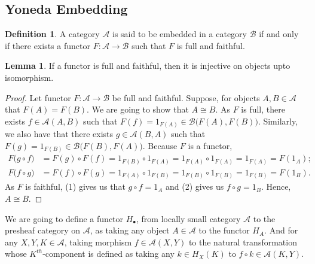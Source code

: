 \documentclass[a4paper]{article}
\theoremstyle{definition}
\newtheorem{definition}[theorem]{Definition}
\newtheorem{lemma}[theorem]{Lemma}
\begin{document}
		\subsection{Yoneda Embedding}%
		\begin{definition} %
			A category $\mathcal{A}$  is said to be embedded in a category $\mathcal{B}$ if
			and only if there exists a functor $F: \mathcal{A} \to \mathcal{B}$
			such that $F$ is full and faithful.
		\end{definition} %
		\begin{lemma}
			If a functor is full and faithful, then it is injective on objects upto isomorphism.
		\end{lemma}
		\begin{proof} \setcounter{equation}{0}
			Let functor $F:\mathcal{A} \to \mathcal{B} $ be full and faithful. Suppose, for
			objects $A,B\in \mathcal{A} $ that $F(A)=F(B)$. We are going to show that
			$A\cong B$. As $F$ is full, there exists $f \in \mathcal{A} (A,B)$ such that
			$F(f)=1_{F(A)}\in \mathcal{B} \big(F(A),F(B)\big)$. Similarly, we also have that
			there exists $g \in \mathcal{A} (B,A)$ such that
			$F(g)=1_{F(B)}\in \mathcal{B} \big(F(B),F(A)\big)$. Because $F$ is a functor,
			\begin{align}
				F\big( g \circ f \big)&=F(g) \circ F(f) = 1_{F(B)} \circ 1_{F(A)}=
				1_{F(A)} \circ 1_{F(A)}=1_{F(A)}=F(1_A); \\
				F\big( f \circ g \big)&=F(f) \circ F(g) = 1_{F(A)} \circ 1_{F(B)}=
				1_{F(B)} \circ 1_{F(B)}=1_{F(B)}=F(1_B).
			\end{align}
			As $F$ is faithful, (1) gives us that $g\circ f=1_A$ and (2) gives us
			$f \circ g = 1_B$. Hence, $A\cong B$.

		\end{proof}

		We are going to define a functor $H_\bullet$, from locally small category $\mathcal{A}$ to the presheaf category on
		$\mathcal{A} $, as taking any object $A \in \mathcal{A} $ to the functor $H_A$.
		And for any $X,Y,K \in \mathcal{A}$, taking morphism $f\in \mathcal{A} (X,Y)$
		to the natural transformation whose $K^{th}$-component is defined as taking any $k \in H_X(K)$
		to $f \circ k \in \mathcal{A} (K,Y)$.
\end{document}
